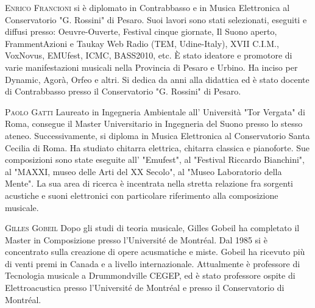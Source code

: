 \documentclass[9pt, twoside, a5paper]{extreport}
\newcommand{\biografia}[2]{%
\noindent \textsc{#1} %
#2 %
\medskip
}%
\begin{document}
\begin{multicols}{2}
\biografia{Enrico Francioni}{si è diplomato in Contrabbasso e in Musica Elettronica al Conservatorio "G. Rossini" di Pesaro. Suoi lavori sono stati selezionati, eseguiti e diffusi presso: Oeuvre-Ouverte, Festival cinque giornate, Il Suono aperto, FrammentAzioni e Taukay Web Radio (TEM, Udine-Italy), XVII C.I.M., VoxNovus, EMUfest, ICMC, BASS2010, etc.
È stato ideatore e promotore di varie manifestazioni musicali nella Provincia di Pesaro e Urbino.
Ha inciso per Dynamic, Agorà, Orfeo e altri. Si dedica da anni alla didattica ed è stato docente di Contrabbasso presso il Conservatorio "G. Rossini" di Pesaro.}


\biografia{Paolo Gatti}{Laureato in Ingegneria Ambientale all' Università "Tor Vergata" di Roma, consegue il Master Universitario in Ingegneria del Suono presso lo stesso ateneo. Successivamente, si diploma in Musica Elettronica al Conservatorio Santa Cecilia di Roma. Ha studiato chitarra elettrica, chitarra classica e pianoforte. Sue composizioni sono state eseguite all' "Emufest", al "Festival Riccardo Bianchini", al "MAXXI, museo delle Arti del XX Secolo", al "Museo Laboratorio della Mente". La sua area di ricerca è incentrata nella stretta relazione fra sorgenti acustiche e suoni elettronici con particolare riferimento alla composizione musicale.}

\biografia{Gilles Gobeil}{Dopo gli studi di teoria musicale, Gilles Gobeil ha completato il Master in Composizione presso l'Université de Montréal. Dal 1985 si è concentrato sulla creazione di opere acusmatiche e miste. Gobeil ha ricevuto più di venti premi in Canada e a livello internazionale. Attualmente è professore di Tecnologia musicale a Drummondville CEGEP, ed è stato professore ospite di Elettroacustica presso l'Université de Montréal e presso il Conservatorio di Montréal.}



\end{multicols}
\end{document}
